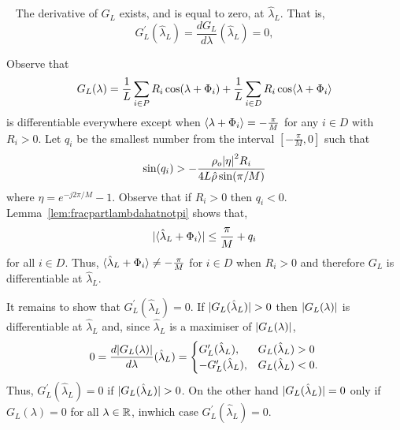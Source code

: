\documentclass[journal]{IEEEtran}
\begin{document}
\begin{lemma}~\label{lem:diffatlambdaL}
The derivative of $G_L$ exists, and is equal to zero, at $\hat{\lambda}_L$.  That is,
\[
G_L^\prime(\hat{\lambda}_L) = \frac{d G_L}{d \lambda}(\hat{\lambda}_L) = 0,
\]
\end{lemma}
\begin{IEEEproof}
Observe that 
\[
G_L(\lambda) = \frac{1}{L}\sum_{i \in P} R_i \cos(\lambda + \Phi_i) + \frac{1}{L} \sum_{i \in D} R_i \cos\langle \lambda + \Phi_i \rangle
\] 
is differentiable everywhere except when $\left\langle \lambda + \Phi_i \right\rangle = -\tfrac{\pi}{M}$ for any $i \in D$ with $R_i > 0$.  Let $q_i$ be the smallest number from the interval $[-\tfrac{\pi}{M}, 0]$ such that
\[
 \sin(q_i) > -\frac{\rho_o {\vert \eta \vert}^2 R_i}{4 L \hat{\rho} \sin(\pi/M)}
\]
where $\eta = e^{-j2\pi/M} - 1$.  Observe that if $R_i > 0$ then $q_i < 0$.  Lemma~\ref{lem:fracpartlambdahatnotpi} shows that,
\[
{\vert \langle \hat{\lambda}_L + \Phi_i \rangle \vert} \leq \frac{\pi}{M} + q_i
\]
for all $i \in D$.  Thus, $\langle \hat{\lambda}_L + \Phi_i \rangle \neq -\tfrac{\pi}{M}$ for $i \in D$ when $R_i > 0$ and therefore $G_L$ is differentiable at $\hat{\lambda}_L$.  

It remains to show that $G_L^\prime(\hat{\lambda}_L) = 0$.  If ${\vert G_L(\hat{\lambda}_L) \vert} > 0$ then ${\vert G_L(\lambda) \vert}$ is differentiable at $\hat{\lambda}_L$ and, since $\hat{\lambda}_L$ is a maximiser of ${\vert G_L(\lambda) \vert}$,
\[
0 = \frac{d {\vert G_L(\lambda) \vert}}{d \lambda}(\hat{\lambda}_L) = \begin{cases} 
G_L^\prime(\hat{\lambda}_L), & G_L(\hat{\lambda}_L) > 0\\
-G_L^\prime(\hat{\lambda}_L), & G_L(\hat{\lambda}_L) < 0.
\end{cases}
\]
Thus, $G_L^\prime(\hat{\lambda}_L) = 0$ if ${\vert G_L(\hat{\lambda}_L) \vert} > 0$.  On the other hand ${\vert G_L(\hat{\lambda}_L) \vert} = 0$ only if $G_L(\lambda) = 0$ for all $\lambda \in {\mathbb R}$, inwhich case $G_L^\prime(\hat{\lambda}_L) = 0$. 
\end{IEEEproof}
\end{document}

